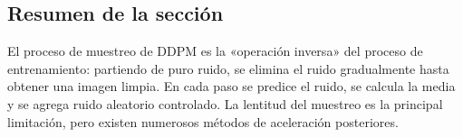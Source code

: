 \subsection{Resumen de la sección}

El proceso de muestreo de DDPM es la «operación inversa» del proceso de entrenamiento: partiendo de puro ruido, se elimina el ruido gradualmente hasta obtener una imagen limpia. En cada paso se predice el ruido, se calcula la media y se agrega ruido aleatorio controlado. La lentitud del muestreo es la principal limitación, pero existen numerosos métodos de aceleración posteriores.

